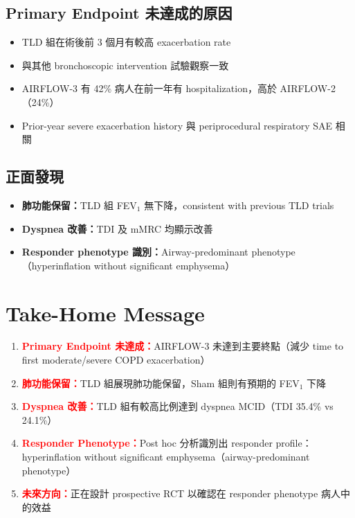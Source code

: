 \documentclass[12pt,a4paper]{article}
\begin{document}
\subsection{Primary Endpoint 未達成的原因}

\begin{itemize}
    \item TLD 組在術後前 3 個月有較高 exacerbation rate
    \item 與其他 bronchoscopic intervention 試驗觀察一致
    \item AIRFLOW-3 有 42\% 病人在前一年有 hospitalization，高於 AIRFLOW-2（24\%）
    \item Prior-year severe exacerbation history 與 periprocedural respiratory SAE 相關
\end{itemize}

\subsection{正面發現}

\begin{itemize}
    \item \textbf{肺功能保留：}TLD 組 FEV$_1$ 無下降，consistent with previous TLD trials
    \item \textbf{Dyspnea 改善：}TDI 及 mMRC 均顯示改善
    \item \textbf{Responder phenotype 識別：}Airway-predominant phenotype（hyperinflation without significant emphysema）
\end{itemize}

\section{Take-Home Message}

\begin{enumerate}
    \item \textcolor{red}{\textbf{Primary Endpoint 未達成：}}AIRFLOW-3 未達到主要終點（減少 time to first moderate/severe COPD exacerbation）
    \item \textcolor{red}{\textbf{肺功能保留：}}TLD 組展現肺功能保留，Sham 組則有預期的 FEV$_1$ 下降
    \item \textcolor{red}{\textbf{Dyspnea 改善：}}TLD 組有較高比例達到 dyspnea MCID（TDI 35.4\% vs 24.1\%）
    \item \textcolor{red}{\textbf{Responder Phenotype：}}Post hoc 分析識別出 responder profile：hyperinflation without significant emphysema（airway-predominant phenotype）
    \item \textcolor{red}{\textbf{未來方向：}}正在設計 prospective RCT 以確認在 responder phenotype 病人中的效益
\end{enumerate}
\end{document}
